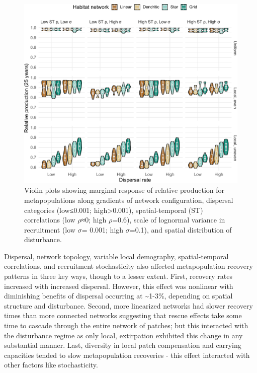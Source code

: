 \documentclass[
]{article}
\begin{document}
\begin{figure}[H]

{\centering \includegraphics{Managing_for_ecological_surprises_in_metapopulations_files/figure-latex/violin plots of risk of relative production-1} 

}

\caption{Violin plots showing marginal response of relative production for metapopulations along gradients of network configuration, dispersal categories (low≤0.001; high>0.001), spatial-temporal (ST) correlations (low $\rho$≈0; high $\rho$=0.6), scale of lognormal variance in recruitment (low $\sigma$= 0.001; high $\sigma$=0.1), and spatial distribution of disturbance.}\label{fig:violin plots of risk of relative production}
\end{figure}

Dispersal, network topology, variable local demography, spatial-temporal
correlations, and recruitment stochasticity also affected metapopulation
recovery patterns in three key ways, though to a lesser extent. First,
recovery rates increased with increased dispersal. However, this effect
was nonlinear with diminishing benefits of dispersal occurring at
\textasciitilde1-3\%, depending on spatial structure and disturbance.
Second, more linearized networks had slower recovery times than more
connected networks suggesting that rescue effects take some time to
cascade through the entire network of patches; but this interacted with
the disturbance regime as only local, extirpation exhibited this change
in any substantial manner. Last, diversity in local patch compensation
and carrying capacities tended to slow metapopulation recoveries - this
effect interacted with other factors like stochasticity.
\end{document}
